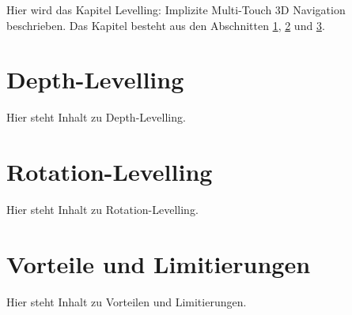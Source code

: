 Hier wird das Kapitel Levelling: Implizite Multi-Touch 3D Navigation beschrieben. Das Kapitel besteht aus den Abschnitten \ref{sec:depth_levelling}, \ref{sec:rotation_levelling} und \ref{sec:vorteile_und_limitierungen_implizit}.


\section{Depth-Levelling}
\label{sec:depth_levelling}

Hier steht Inhalt zu Depth-Levelling.


\section{Rotation-Levelling}
\label{sec:rotation_levelling}

Hier steht Inhalt zu Rotation-Levelling.


\section{Vorteile und Limitierungen}
\label{sec:vorteile_und_limitierungen_implizit}

Hier steht Inhalt zu Vorteilen und Limitierungen.